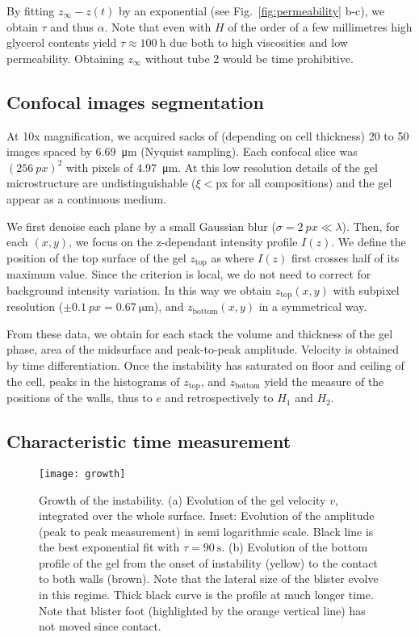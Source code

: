 \documentclass[twocolumn,superscriptaddress,showpacs,preprintnumbers,amsmath,amssymb,prl]{revtex4-1}
\begin{document}
By fitting $z_\infty-z(t)$ by an exponential (see Fig.~\ref{fig:permeability} b-c), we obtain $\tau$ and thus $\alpha$. Note that even with $H$ of the order of a few millimetres high glycerol contents yield $\tau\approx \SI{100}{\hour}$ due both to high viscosities and low permeability. Obtaining $z_\infty$ without tube 2 would be time prohibitive.

\subsection*{Confocal images segmentation}

At 10x magnification, we acquired sacks of (depending on cell thickness) 20 to 50 images spaced by \SI{6.69}{\micro\metre} (Nyquist sampling). Each confocal slice was $(\SI{256}{px})^2$ with pixels of \SI{4.97}{\micro\metre}. At this low resolution details of the gel microstructure are undistinguishable ($\xi<$px for all compositions) and the gel appear as a continuous medium.

We first denoise each plane by a small Gaussian blur ($\sigma=\SI{2}{px}\ll\lambda$). Then, for each $(x,y)$, we focus on the z-dependant intensity profile $I(z)$. We define the position of the top surface of the gel $z_\text{top}$ as where $I(z)$ first crosses half of its maximum value. Since the criterion is local, we do not need to correct for background intensity variation. In this way we obtain $z_\text{top}(x,y)$ with subpixel resolution ($\pm\SI{0.1}{px}=\SI{0.67}{\micro\metre}$), and $z_\text{bottom}(x,y)$ in a symmetrical way.

From these data, we obtain for each stack the volume and thickness of the gel phase, area of the midsurface and peak-to-peak amplitude. Velocity is obtained by time differentiation. Once the instability has saturated on floor and ceiling of the cell, peaks in the histograms of $z_\text{top}$, and $z_\text{bottom}$ yield the measure of the positions of the walls, thus to $e$ and retrospectively to $H_1$ and $H_2$.

\subsection*{Characteristic time measurement}
\begin{figure}
	\texttt{[image: growth]}
	\caption{Growth of the instability. (a) Evolution of the gel velocity $v$, integrated over the whole surface. Inset: Evolution of the amplitude (peak to peak measurement) in semi logarithmic scale. Black line is the best exponential fit with $\tau=\SI{90}{\second}$. (b) Evolution of the bottom profile of the gel from the onset of instability (yellow) to the contact to both walls (brown). Note that the lateral size of the blister evolve in this regime. Thick black curve is the profile at much longer time. Note that blister foot (highlighted by the orange vertical line) has not moved since contact.}
	\label{fig:growth}
\end{figure}
\end{document}
